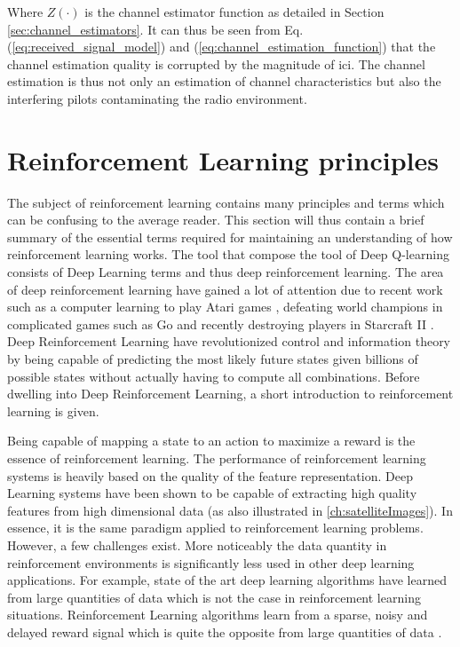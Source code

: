 Where $Z(\cdot)$ is the channel estimator function as detailed in Section \ref{sec:channel_estimators}. It can thus be seen from Eq. (\ref{eq:received_signal_model}) and (\ref{eq:channel_estimation_function}) that the channel estimation quality is corrupted by the magnitude of \gls{ici}. The channel estimation is thus not only an estimation of channel characteristics but also the interfering pilots contaminating the radio environment.

\section{Reinforcement Learning principles}\label{sec:reinforcement_learning_principles}
The subject of reinforcement learning contains many principles and terms which can be confusing to the average reader. This section will thus contain a brief summary of the essential terms required for maintaining an understanding of how reinforcement learning works. The tool that compose the tool of Deep Q-learning consists of Deep Learning terms and thus deep reinforcement learning. The area of deep reinforcement learning have gained a lot of attention due to recent work such as a computer learning to play Atari games \cite{MnihPlayingLearning}, defeating world champions in complicated games such as Go \cite{Silver2016MasteringSearch} and recently destroying players in Starcraft II \cite{Vinyals2019GrandmasterLearning}. Deep Reinforcement Learning have revolutionized control and information theory by being capable of predicting the most likely future states given billions of possible states without actually having to compute all combinations. Before dwelling into Deep Reinforcement Learning, a short introduction to reinforcement learning is given.

Being capable of mapping a state to an action to maximize a reward is the essence of reinforcement learning. The performance of reinforcement learning systems is heavily based on the quality of the feature representation. Deep Learning systems have been shown to be capable of extracting high quality features from high dimensional data (as also illustrated in \ref{ch:satelliteImages}). In essence, it is the same paradigm applied to reinforcement learning problems. However, a few challenges exist. More noticeably the data quantity in reinforcement environments is significantly less used in other deep learning applications. For example, state of the art deep learning algorithms have learned from large quantities of data which is not the case in reinforcement learning situations. Reinforcement Learning algorithms learn from a sparse, noisy and delayed reward signal which is quite the opposite from large quantities of data \cite{Sutton2017ReinforcementSecond}. 

